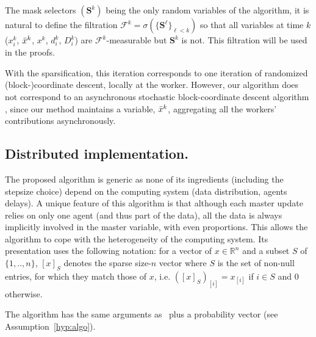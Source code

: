 The mask selectors $(\mathbf{S}^k)$ being the only random variables of the algorithm,  it is natural to define the filtration $\mathcal{F}^k = \sigma( \{\mathbf{S}^\ell\}_{\ell<k} )$ so that all variables at time $k$ ($x_i^k$, $\bar{x}^k$, $x^k$, $d_i^k$, $D_i^k$) are $\mathcal{F}^k$-measurable but $\mathbf{S}^k$ is not. This filtration will be used in the proofs.



With the sparsification, this iteration corresponds to one iteration of randomized (block-)coordinate descent, locally at the worker. However, our algorithm does not correspond to an asynchronous stochastic block-coordinate descent algorithm \cite{liu2015asynchronous,sun2017asynchronous,peng2016arock,richtarik2016distributed}, since our method maintains a variable, $\bar{x}^k$, aggregating all the workers' contributions asynchronously.



\subsection{Distributed implementation.}


The proposed algorithm \salgo is generic as none of its ingredients (including the stepsize choice) depend on the computing system  (data distribution, agents delays). A unique feature of this algorithm is that although each master update relies on only one agent (and thus part of the data), all the data is always implicitly involved in the master variable, with even proportions. This allows the algorithm to cope with the heterogeneity of the computing system. Its presentation uses the following notation:
for a vector of $x\in\mathbb{R}^n$ and a subset $S$ of $\{1,..,n\}$, $[x]_{S}$ denotes the sparse size-$n$ vector where $S$ is the set of non-null entries, for which they match those of $x$, i.e. $([x]_{S})_{[i]} = x_{[i]}$ if $i\in S$ and $0$ otherwise.

The algorithm \salgo has the same arguments as \dave~plus a probability vector (see Assumption~\ref{hyp:algo}).

